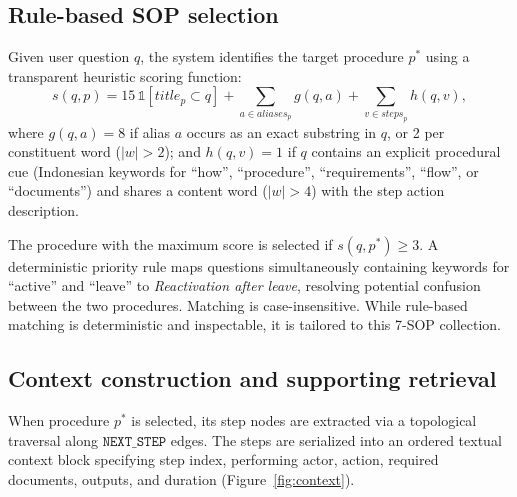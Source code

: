 \documentclass[preprint,10pt]{elsarticle}
\begin{document}
\subsection{Rule-based SOP selection}
Given user question $q$, the system identifies the target procedure $p^\ast$ using a transparent heuristic scoring function:
\begin{equation}
s(q,p) = 15\,\mathbb{1}[\textit{title}_p \subset q] + \sum_{a \in \textit{aliases}_p} g(q,a) + \sum_{v \in \textit{steps}_p} h(q,v),
\label{eq:score}
\end{equation}
where $g(q,a) = 8$ if alias $a$ occurs as an exact substring in $q$, or 2 per constituent word ($|w| > 2$); and $h(q,v) = 1$ if $q$ contains an explicit procedural cue (Indonesian keywords for ``how'', ``procedure'', ``requirements'', ``flow'', or ``documents'') and shares a content word ($|w| > 4$) with the step action description.

The procedure with the maximum score is selected if $s(q,p^\ast) \geq 3$. A deterministic priority rule maps questions simultaneously containing keywords for ``active'' and ``leave'' to \emph{Reactivation after leave}, resolving potential confusion between the two procedures. Matching is case-insensitive. While rule-based matching is deterministic and inspectable, it is tailored to this 7-SOP collection.

\subsection{Context construction and supporting retrieval}
When procedure $p^\ast$ is selected, its step nodes are extracted via a topological traversal along $\texttt{NEXT\_STEP}$ edges. The steps are serialized into an ordered textual context block specifying step index, performing actor, action, required documents, outputs, and duration (Figure~\ref{fig:context}).
\end{document}
